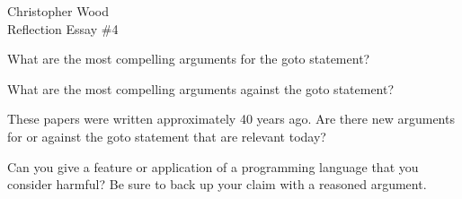 \documentclass[12pt,letterpaper]{article}
\begin{document}
\begin{center}
Christopher Wood \\
Reflection Essay \#4 \\
\end{center}

\begin{questions}
What are the most compelling arguments for the goto statement?

What are the most compelling arguments against the goto statement?

These papers were written approximately 40 years ago. Are there new arguments for or against the goto statement that are relevant 
today?

Can you give a feature or application of a programming language that you consider harmful? Be sure to back up your claim with a reasoned argument.
\end{questions}



\end{document}
